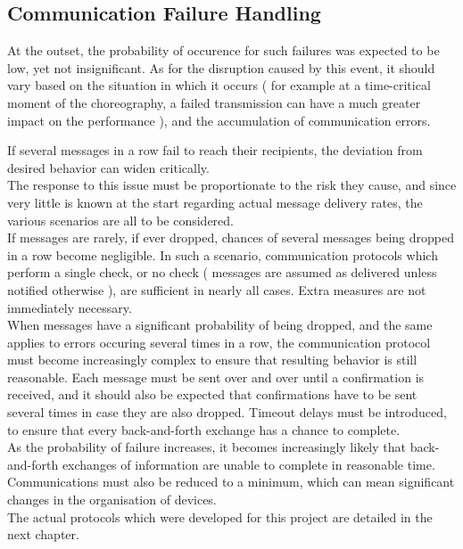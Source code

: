 \subsection{Communication Failure Handling}

At the outset, the probability of occurence for such failures was expected to be low, yet not insignificant. As for the disruption caused by this event, it should vary based on the situation in which it occurs ( for example at a time-critical moment of the choreography, a failed transmission can have a much greater impact on the performance ), and the accumulation of communication errors.

If several messages in a row fail to reach their recipients, the deviation from desired behavior can widen critically.\\

The response to this issue must be proportionate to the risk they cause, and since very little is known at the start regarding actual message delivery rates, the various scenarios are all to be considered.\\

If messages are rarely, if ever dropped, chances of several messages being dropped in a row become negligible. In such a scenario, communication protocols which perform a single check, or no check ( messages are assumed as delivered unless notified otherwise ), are sufficient in nearly all cases. Extra measures are not immediately necessary.\\

When messages have a significant probability of being dropped, and the same applies to errors occuring several times in a row, the communication protocol must become increasingly complex to ensure that resulting behavior is still reasonable. Each message must be sent over and over until a confirmation is received, and it should also be expected that confirmations have to be sent several times in case they are also dropped. Timeout delays must be introduced, to ensure that every back-and-forth exchange has a chance to complete.\\

As the probability of failure increases, it becomes increasingly likely that back-and-forth exchanges of information are unable to complete in reasonable time. Communications must also be reduced to a minimum, which can mean significant changes in the organisation of devices.\\

The actual protocols which were developed for this project are detailed in the next chapter.

